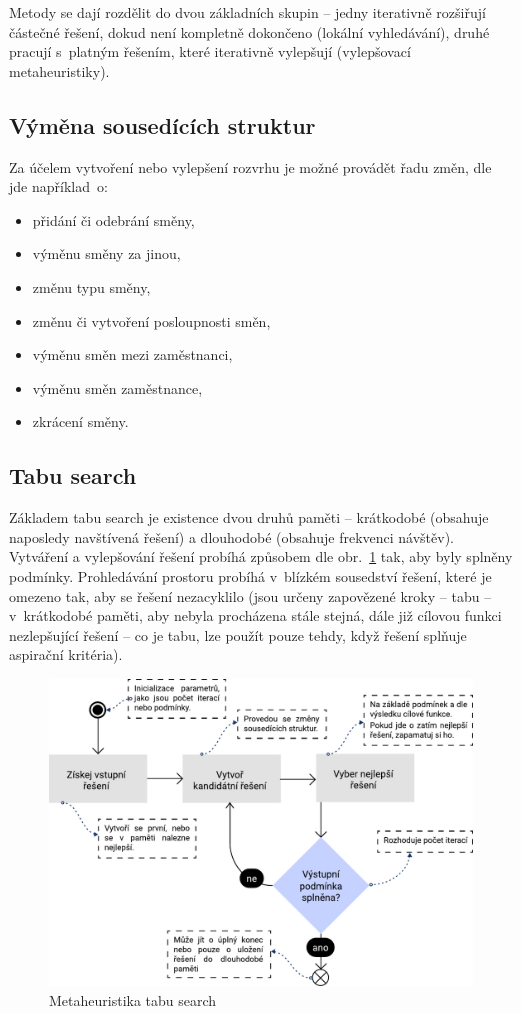 \documentclass[twoside]{ctuthesis}
\begin{document}
Metody se dají rozdělit do dvou základních skupin -- jedny iterativně rozšiřují částečné řešení, dokud není kompletně dokončeno (lokální vyhledávání), druhé pracují s~platným řešením, které iterativně vylepšují (vylepšovací metaheuristiky). \cite{van2013personnel}

\subsection{Výměna sousedících struktur}
Za účelem vytvoření nebo vylepšení rozvrhu je možné provádět řadu změn, dle \cite{kletzander2020solving} jde například~o:
\begin{itemize}
	\item přidání či odebrání směny,
	\item výměnu směny za jinou,
	\item změnu typu směny,
	\item změnu či vytvoření posloupnosti směn,
	\item výměnu směn mezi zaměstnanci,
	\item výměnu směn zaměstnance,
	\item zkrácení směny.
\end{itemize}


\subsection{Tabu search}
Základem tabu search je existence dvou druhů paměti – krátkodobé (obsahuje naposledy navštívená řešení) a dlouhodobé (obsahuje frekvenci návštěv). \cite{liang2020optimization} Vytváření a vylepšování řešení probíhá způsobem dle obr.~\ref{fig:tabusearch} tak, aby byly splněny podmínky. Prohledávání prostoru probíhá v~blízkém sousedství řešení, které je omezeno tak, aby se řešení nezacyklilo (jsou určeny zapovězené kroky -- tabu -- v~krátkodobé paměti, aby nebyla procházena stále stejná, dále již cílovou funkci nezlepšující řešení -- co je tabu, lze použít pouze tehdy, když řešení splňuje aspirační kritéria).  \cite{glover1990tabu}

\begin{figure}[h]
	\includegraphics[scale=0.7]{img/tabu-search.pdf}
	\caption{Metaheuristika tabu search}
	\label{fig:tabusearch}
\end{figure}
\end{document}
